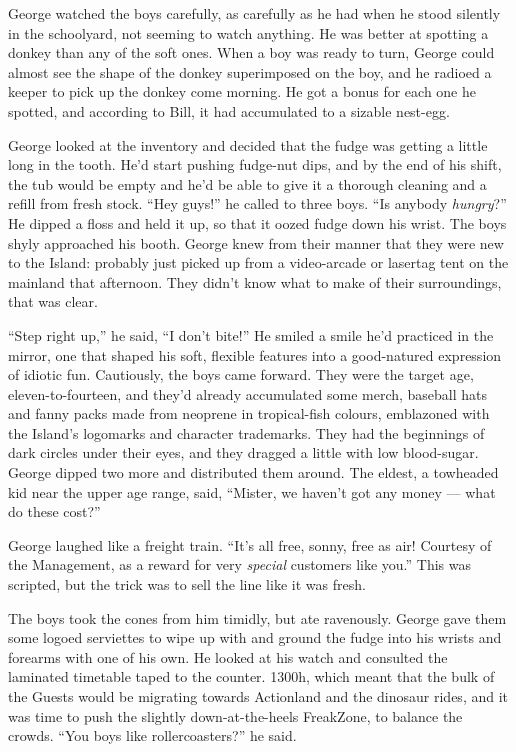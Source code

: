 George watched the boys carefully, as carefully as he had when he
stood silently in the schoolyard, not seeming to watch anything. He
was better at spotting a donkey than any of the soft ones. When a
boy was ready to turn, George could almost see the shape of the
donkey superimposed on the boy, and he radioed a keeper to pick up
the donkey come morning. He got a bonus for each one he spotted,
and according to Bill, it had accumulated to a sizable nest-egg.

George looked at the inventory and decided that the fudge was
getting a little long in the tooth. He'd start pushing fudge-nut
dips, and by the end of his shift, the tub would be empty and he'd
be able to give it a thorough cleaning and a refill from fresh
stock. ``Hey guys!'' he called to three boys.
``Is anybody \emph{hungry}?'' He dipped a floss and held it up, so
that it oozed fudge down his wrist. The boys shyly approached his
booth. George knew from their manner that they were new to the
Island: probably just picked up from a video-arcade or lasertag
tent on the mainland that afternoon. They didn't know what to make
of their surroundings, that was clear.

``Step right up,'' he said, ``I don't bite!'' He smiled a smile
he'd practiced in the mirror, one that shaped his soft, flexible
features into a good-natured expression of idiotic fun. Cautiously,
the boys came forward. They were the target age,
eleven-to-fourteen, and they'd already accumulated some merch,
baseball hats and fanny packs made from neoprene in tropical-fish
colours, emblazoned with the Island's logomarks and character
trademarks. They had the beginnings of dark circles under their
eyes, and they dragged a little with low blood-sugar. George dipped
two more and distributed them around. The eldest, a towheaded kid
near the upper age range, said,
``Mister, we haven't got any money --- what do these cost?''

George laughed like a freight train.
``It's all free, sonny, free as air! Courtesy of the Management, as a reward 
for very \emph{special} customers like you.''
This was scripted, but the trick was to sell the line like it was
fresh.

The boys took the cones from him timidly, but ate ravenously.
George gave them some logoed serviettes to wipe up with and ground
the fudge into his wrists and forearms with one of his own. He
looked at his watch and consulted the laminated timetable taped to
the counter. 1300h, which meant that the bulk of the Guests would
be migrating towards Actionland and the dinosaur rides, and it was
time to push the slightly down-at-the-heels FreakZone, to balance
the crowds. ``You boys like rollercoasters?'' he said.

